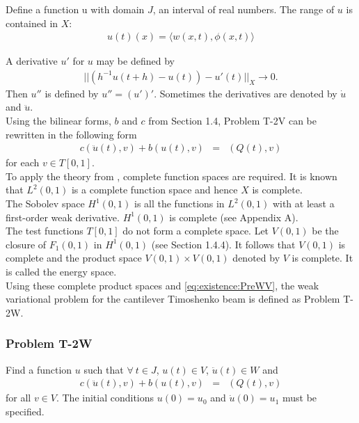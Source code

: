 \documentclass[../../main.tex]{subfiles}
\begin{document}
Define a function u with domain $J$, an interval of real numbers. The range of $u$ is contained in $X$:
\begin{eqnarray}
	u(t)(x) = \langle w(x,t), \phi(x,t) \rangle \label{def_of_u}
\end{eqnarray}

A derivative $u'$ for $u$ may be defined by
\begin{eqnarray*}
	||\left(h^{-1} u(t+h)-u(t)\right)-u'(t)||_X \rightarrow 0.
\end{eqnarray*} Then $u''$ is defined by $u'' = (u')'$. Sometimes the derivatives are denoted by $\dot{u}$ and $\ddot{u}$.\\

Using the bilinear forms, $b$ and $c$ from Section 1.4, Problem T-2V can be rewritten in the following form
\begin{eqnarray}
	c(\ddot{u}(t),v) + b(u(t),v) & = & (Q(t),v) \label{eq:existence:PreWV}
\end{eqnarray} for each $v \in T[0,1]$.\\

To apply the theory from \cite{VV02}, complete function spaces are required. It is known that $L^2(0,1)$ is a complete function space and hence $X$ is complete.\\

The Sobolev space $H^1(0,1)$ is all the functions in $L^2(0,1)$ with at least a first-order weak derivative. $H^1(0,1)$ is complete (see Appendix A).\\

The test functions $T[0,1]$ do not form a complete space. Let $V(0,1)$ be the closure of {$F_1(0,1)$} in $H^1(0,1)$ (see Section 1.4.4). It follows that $V(0,1)$ is complete and the product space {$V(0,1)\times V(0,1)$} denoted by $V$ is complete. It is called the energy space.\\

Using these complete product spaces and \eqref{eq:existence:PreWV}, the weak variational problem for the cantilever Timoshenko beam is defined as Problem T-2W.

\subsubsection{Problem T-2W}\label{sssec:existence:ProblemT2W}
Find a function $u$ such that $\forall \ t \in J$, $u(t) \in V$, $\ddot{u}(t) \in W$ and
\begin{eqnarray*}
	c(\ddot{u}(t),v) + b(u(t),v) & = & (Q(t),v)
\end{eqnarray*}
for all $v\in V$. The initial conditions $u(0) = u_0$ and $\dot{u}(0)=u_1$ must be specified.\\
\end{document}
